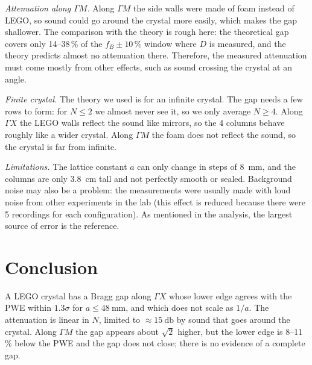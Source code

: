 \documentclass[9pt,a4paper,twocolumn]{extarticle}
\newcommand{\pbreak}{\par\vspace{3pt}}
\newcommand{\umm}{\milli\metre}
\newcommand{\ucm}{\centi\metre}
\newcommand{\udB}{\decibel}
\newcommand{\GX}{\ensuremath{\Gamma X}}
\newcommand{\GM}{\ensuremath{\Gamma M}}
\begin{document}
\emph{Attenuation along \GM.} Along \GM{} the side walls were made of foam instead of LEGO, so sound could go around the crystal more easily, which makes the gap shallower. The comparison with the theory is rough here: the theoretical gap covers only 14--38\,\% of the $f_B\pm10\,\%$ window where $D$ is measured, and the theory predicts almost no attenuation there. Therefore, the measured attenuation must come mostly from other effects, such as sound crossing the crystal at an angle.

\emph{Finite crystal.} The theory we used is for an infinite crystal. The gap needs a few rows to form: for $N\le2$ we almost never see it, so we only average $N\ge4$. Along \GX{} the LEGO walls reflect the sound like mirrors, so the 4 columns behave roughly like a wider crystal. Along \GM{} the foam does not reflect the sound, so the crystal is far from infinite.

\emph{Limitations.} The lattice constant $a$ can only change in steps of \SI{8}{\umm}, and the columns are only \SI{3.8}{\ucm} tall and not perfectly smooth or sealed. Background noise may also be a problem: the measurements were usually made with loud noise from other experiments in the lab (this effect is reduced because there were 5 recordings for each configuration). As mentioned in the analysis, the largest source of error is the reference.

\section{Conclusion}
A LEGO crystal has a Bragg gap along \GX{} whose lower edge agrees with the PWE within $1.3\sigma$ for $a\le\SI{48}{\umm}$, and which does not scale as $1/a$. The attenuation is linear in $N$, limited to $\approx\SI{15}{\udB}$ by sound that goes around the crystal. Along \GM{} the gap appears about $\sqrt2$ higher, but the lower edge is 8--11\,\% below the PWE and the gap does not close; there is no evidence of a complete gap.


\pbreak
\onecolumn
\appendix
\end{document}
